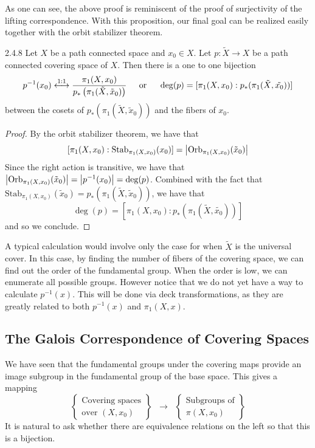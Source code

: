 \documentclass[a4paper]{article}
\begin{document}
As one can see, the above proof is reminiscent of the proof of surjectivity of the lifting correspondence. With this proposition, our final goal can be realized easily together with the orbit stabilizer theorem. 

\begin{thm}{}{2.4.8} Let $X$ be a path connected space and $x_0\in X$. Let $p:\tilde{X}\to X$ be a path connected covering space of $X$. Then there is a one to one bijection $$p^{-1}(x_0)\overset{\text{1:1}}{\longleftrightarrow}\frac{\pi_1(X,x_0)}{p_\ast\left(\pi_1(\tilde{X},\tilde{x}_0)\right)}\text{\;\;\;\; or \;\;\;\;}\deg(p)=[\pi_1(X,x_0):p_\ast(\pi_1(\tilde{X},\tilde{x_0}))]$$ between the cosets of $p_\ast\left(\pi_1(\tilde{X},\tilde{x}_0)\right)$ and the fibers of $x_0$. \tcbline
\begin{proof}
By the orbit stabilizer theorem, we have that $$[\pi_1(X,x_0):\text{Stab}_{\pi_1(X,x_0)}(x_0)]=\abs{\text{Orb}_{\pi_1(X,x_0)}(\tilde{x}_0)}$$ Since the right action is transitive, we have that $\abs{\text{Orb}_{\pi_1(X,x_0)}(\tilde{x}_0)}=\abs{p^{-1}(x_0)}=\deg(p)$. Combined with the fact that $\text{Stab}_{\pi_1(X,x_0)}(\tilde{x}_0)=p_\ast\left(\pi_1(\tilde{X},\tilde{x}_0)\right)$, we have that $$\deg(p)=[\pi_1(X,x_0):p_\ast(\pi_1(\tilde{X},\tilde{x_0}))]$$ and so we conclude. 
\end{proof}
\end{thm}

A typical calculation would involve only the case for when $\tilde{X}$ is the universal cover. In this case, by finding the number of fibers of the covering space, we can find out the order of the fundamental group. When the order is low, we can enumerate all possible groups. However notice that we do not yet have a way to calculate $p^{-1}(x)$. This will be done via deck transformations, as they are greatly related to both $p^{-1}(x)$ and $\pi_1(X,x)$. 

\subsection{The Galois Correspondence of Covering Spaces}
We have seen that the fundamental groups under the covering maps provide an image subgroup in the fundamental group of the base space. This gives a mapping $$\left\{\substack{\text{Covering spaces}\\\text{over }(X,x_0)}\right\}\;\;\longrightarrow\;\;\left\{\substack{\text{Subgroups of}\\ \pi(X,x_0)}\right\}$$ It is natural to ask whether there are equivalence relations on the left so that this is a bijection. 
\end{document}
